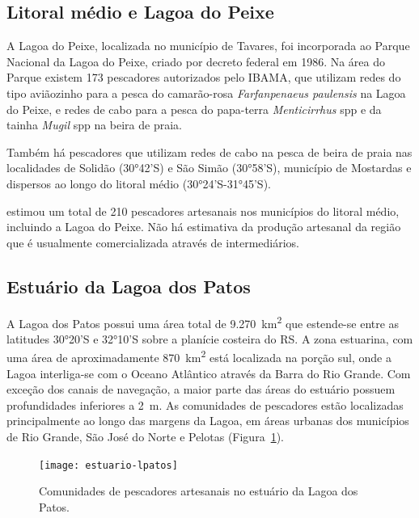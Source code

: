 \documentclass[a4paper,11pt,twoside,showtrims,onecolumn,openright,final]{memoir}
\begin{document}
\subsection*{Litoral médio e Lagoa do Peixe}

A Lagoa do Peixe, localizada no município de Tavares, foi incorporada ao 
Parque Nacional da Lagoa do Peixe, criado por decreto federal em 1986. 
Na área do Parque existem 173 pescadores autorizados pelo IBAMA, que
utilizam redes do tipo aviãozinho para a pesca do camarão-rosa \emph{Farfanpenaeus paulensis}
na Lagoa do Peixe, e redes de cabo para a pesca do papa-terra \emph{Menticirrhus} spp
e da tainha \emph{Mugil} spp na beira de praia.

Também há pescadores que utilizam redes de cabo na pesca de beira de praia
nas localidades de Solidão (30°42'S) e São Simão (30°58'S), município 
de Mostardas e dispersos ao longo do litoral médio (30°24'S-31°45'S). 

\citet{garcez2001} estimou um total de 210 pescadores
artesanais nos municípios do litoral médio, incluindo a Lagoa do Peixe. 
Não há estimativa da produção artesanal da região que é usualmente
comercializada através de intermediários.

\subsection*{Estuário da Lagoa dos Patos}

A Lagoa dos Patos possui uma área total de 9.270~km\textsuperscript{2} que estende-se 
entre as latitudes 30°20'S e 32°10'S sobre a planície costeira do RS. A zona estuarina, 
com uma área de aproximadamente 870~km\textsuperscript{2} está localizada na porção sul, 
onde a Lagoa interliga-se com o Oceano Atlântico através da 
Barra do Rio Grande. Com exceção dos canais de navegação, a maior 
parte das áreas do estuário possuem profundidades inferiores a 2~m. As comunidades de 
pescadores estão localizadas principalmente ao longo das margens da Lagoa, 
em áreas urbanas dos municípios de Rio Grande, São José do Norte 
e Pelotas (Figura~\ref{fig:lpatos}).


\begin{figure}
\begin{center}
\texttt{[image: estuario-lpatos]}
\end{center}
\caption{Comunidades de pescadores artesanais no estuário da Lagoa dos Patos.}
\label{fig:lpatos}	 
\end{figure}
\end{document}
